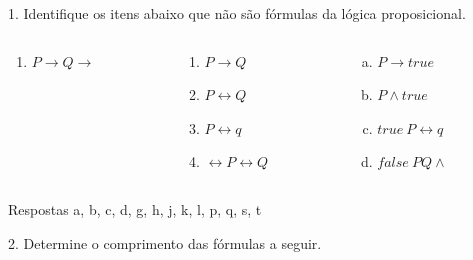 \documentclass[10pt, headsepline, captions=tableabove, xcolor=table]{beamer}
\begin{document}
\begin{frame}[t]
\begin{exampleblock}{1. Identifique os itens abaixo que não são fórmulas da lógica proposicional.}
\begin{columns}[T]
\begin{column}{0.20\textwidth}
\begin{enumerate}[\bf a.]
                    \item $P \rightarrow Q \rightarrow $
                \end{enumerate}
            \end{column}
            \hspace*{-7mm}
            \begin{column}{0.2\textwidth}
                \begin{enumerate}[\bf a.]
                    \addtocounter{enumi}{12}
                    \item $P \rightarrow Q$
                    \item $P \leftrightarrow Q$
                    \item $P \leftrightarrow q$
                    \item $\leftrightarrow P \leftrightarrow Q$
                \end{enumerate}
            \end{column}
            \hspace*{-8mm}
            \begin{column}{0.25\textwidth}
                \begin{enumerate}[a.]
                    \addtocounter{enumi}{16}
                    \item $P \rightarrow true$
                    \item $P \land true$
                    \item $true~P \leftrightarrow q$
                    \item $false~PQ \land$
                \end{enumerate}
            \end{column}
        \end{columns}
    \end{exampleblock}
    \pause
    \vspace{-2mm}
    \begin{alertblock}{Respostas}
        a, b, c, d, g, h, j, k, l, p, q, s, t
    \end{alertblock}
    \pause
    \vspace{-2mm}
    \begin{exampleblock}{2. Determine o comprimento das fórmulas a seguir.}
        \begin{columns}[T]
            \begin{column}{0.8\textwidth}

\end{column}
\end{columns}
\end{exampleblock}
\end{frame}
\end{document}
